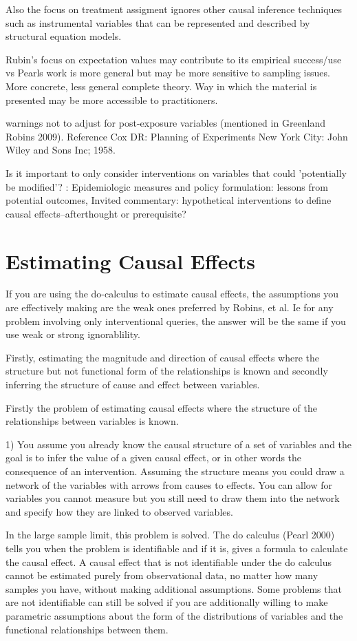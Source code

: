 \documentclass[11pt,a4paper]{article}
\begin{document}
Also the focus on treatment assigment ignores other causal inference techniques such as instrumental variables that can be represented and described by structural equation models. 

Rubin's focus on expectation values may contribute to its empirical success/use vs Pearls work is more general but may be more sensitive to sampling issues. More concrete, less general complete theory. Way in which the material is presented may be more accessible to practitioners. 

warnings not to adjust for post-exposure variables (mentioned in Greenland  Robins 2009). Reference Cox DR: Planning of Experiments New York City: John Wiley and Sons
Inc; 1958.

Is it important to only consider interventions on variables that could 'potentially be modified'? : Epidemiologic measures and policy formulation:
lessons from potential outcomes,
Invited commentary: hypothetical interventions
to define causal effects--afterthought or prerequisite?



\section*{Estimating Causal Effects}

If you are using the do-calculus to estimate causal effects, the assumptions you are effectively making are the weak ones preferred by Robins, et al. Ie for any problem involving only interventional queries, the answer will be the same if you use weak or strong ignorablility. 

Firstly, estimating the magnitude and direction of causal effects where the structure but not functional form of the relationships is known and secondly inferring the structure of cause and effect between variables. 

Firstly the problem of estimating causal effects where the structure of the relationships between variables is known. 

1) You assume you already know the causal structure of a set of variables and the goal is to infer the value of a given causal effect, or in other words the consequence of an intervention. Assuming the structure means you could draw a network of the variables with arrows from causes to effects. You can allow for variables you cannot measure but you still need to draw them into the network and specify how they are linked to observed variables.

In the large sample limit, this problem is solved. The do calculus (Pearl 2000) tells you when the problem is identifiable and if it is, gives a formula to calculate the causal effect. A causal effect that is not identifiable under the do calculus cannot be estimated purely from observational data, no matter how many samples you have, without making additional assumptions. Some problems that are not identifiable can still be solved if you are additionally willing to make parametric assumptions about the form of the distributions of variables and the functional relationships between them.
\end{document}
